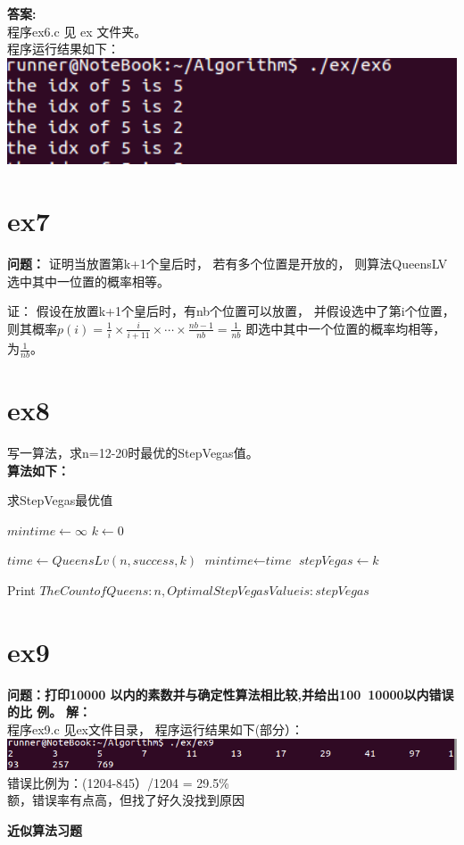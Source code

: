 \documentclass[10pt, a4paper]{article}
\begin{document}
\textbf{答案:} \\
程序ex6.c 见 ex 文件夹。 \\
程序运行结果如下：\\
\includegraphics[width=15cm]{../pic/ex6.png}
\section{ex7}

\textbf{问题：} 
证明当放置第k+1个皇后时， 若有多个位置是开放的， 则算法QueensLV选中其中一位置的概率相等。


证： 假设在放置k+1个皇后时，有nb个位置可以放置， 并假设选中了第i个位置， 则其概率$p(i) = \frac{1}{i}\times\frac{i}{i+11}\times \cdots \times \frac{nb-1}{nb} = \frac{1}{nb}$ 即选中其中一个位置的概率均相等， 为$\frac{1}{nb}$。 

\section{ex8}

写一算法，求n=12-20时最优的StepVegas值。\\
\textbf{算法如下：}
\begin{algorithm}
\caption{求StepVegas最优值}\label{euclid}
\begin{algorithmic}[1]
\State $\textit{mintime} \gets \infty$
\State $\textit{k} \gets 0$

	\State $\textit{time} \gets QueensLv(n, success, \textit{k})$
		\State $\textit{mintime} \gets \textit{time}$
		\State $\textit{stepVegas} \gets k$
 	\EndIf
 	\EndFor
 	
 	\State Print $The Count of Queens:n,  Optimal StepVegas Value is : stepVegas$
\EndFor

\EndProcedure
\end{algorithmic}
\end{algorithm}

\section{ex9}
\textbf{问题：打印10000 以内的素数并与确定性算法相比较,并给出100~10000以内错误的比
例。}
\textbf{解：}\\
程序ex9.c 见ex文件目录， 程序运行结果如下(部分）：\\
\includegraphics[width=15cm]{../pic/ex9.png}
错误比例为：(1204-845）/1204 = 29.5\% \\
 额，错误率有点高，但找了好久没找到原因~
\begin{center} 
\textbf{近似算法习题}
\end{center}
\end{document}
